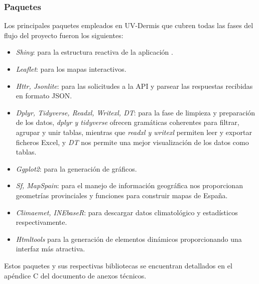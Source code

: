 \subsubsection{Paquetes}
Los principales paquetes empleados en UV-Dermis  que cubren todas las fases del flujo del proyecto fueron los siguientes:
\begin{itemize}
    \item \textit{Shiny}: para la estructura reactiva de la aplicación \cite{shiny}.
    \item \textit{Leaflet}: para los mapas interactivos.
    \item \textit{Httr, Jsonlite}: para las solicitudes a la API y parsear las respuestas recibidas en formato JSON.
    \item \textit{Dplyr, Tidyverse, Readxl, Writexl, DT}: para la fase de limpieza y preparación de los datos, \textit{dplyr y tidyverse} ofrecen gramáticas coherentes para filtrar, agrupar y unir tablas, mientras que \textit{readxl y writexl} permiten leer y exportar ficheros Excel, y \textit{DT} nos permite una mejor visualización de los datos como tablas.
    \item \textit{Ggplot2}: para la generación de gráficos.
    \item \textit{Sf, MapSpain}: para el manejo de información geográfica nos proporcionan geometrías provinciales y funciones para construir mapas de España.
    \item \textit{Climaemet, INEbaseR}: para descargar datos climatológico y estadísticos respectivamente.
    \item \textit{Htmltools} para la generación de elementos dinámicos proporcionando una interfaz más atractiva.
\end{itemize}
Estos paquetes y sus respectivas bibliotecas se encuentran detallados en el apéndice C del documento de anexos técnicos.

